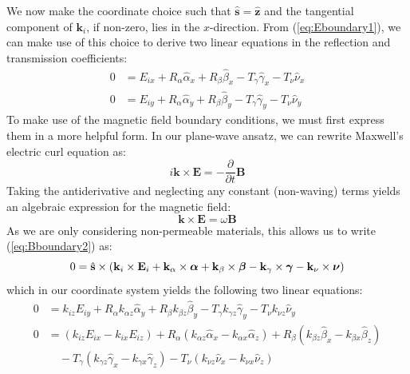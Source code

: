 \documentclass[11pt, reqno]{book}%
\newcounter{ct}
\newcommand{\es}{\begin{equation}}
\newcommand{\ef}{\end{equation} \vspace{0.05in}}
\newcommand{\mbf}{\mathbf}
\newcommand{\mbfg}[1]{\mbf{\mbox{\boldmath$#1$}}}
\newcommand{\mbfh}[1]{\hat{\mbf{#1}}}
\begin{document}
We now make the coordinate choice such that $\mbfh{s}=\mbfh{z}$ and the tangential component of $\mbf{k}_i$, if non-zero, lies in the $x$-direction. From (\ref{eq:Eboundary1}), we can make use of this choice to derive two linear equations in the reflection and transmission coefficients:
\begin{subequations}
\begin{align}
0 &= E_{ix}  +R_\alpha \hat{\alpha}_x +R_\beta \hat{\beta}_x - T_\gamma \hat{\gamma}_x -T_\nu \hat{\nu}_x \\
0 & = E_{iy}  +R_\alpha \hat{\alpha}_y +R_\beta \hat{\beta}_y - T_\gamma \hat{\gamma}_y -T_\nu \hat{\nu}_y
\end{align}
\label{eq:firssetboundaries}%
\end{subequations}
\noindent To make use of the magnetic field boundary conditions, we must first express them in a more helpful form. In our plane-wave ansatz, we can rewrite Maxwell's electric curl equation as: 
\es
i\mbf{k}\times\mbf{E} = -\frac{\partial}{\partial t}\mbf{B}
\ef
\noindent Taking the antiderivative and neglecting any constant (non-waving) terms yields an algebraic expression for the magnetic field:
\es
\mbf{k}\times\mbf{E} = \omega \mbf{B}
\label{eq:BfromE}
\ef
\noindent As we are only considering non-permeable materials, this allows us to write (\ref{eq:Bboundary2}) as:
\es
0 = \mbfh{s} \times \left( \mbf{k}_i \times \mbf{E}_i +\mbf{k}_\alpha \times \mbfg{\alpha} +\mbf{k}_\beta \times \mbfg{\beta} - \mbf{k}_\gamma \times \mbfg{\gamma} -\mbf{k}_\nu \times \mbfg{\nu} \right)
\label{eq:restatedmagbounds}
\ef 
\noindent which in our coordinate system yields the following two linear equations:
\begin{subequations}
\begin{align}
0 & = k_{iz} E_{iy} + R_\alpha k_{\alpha z} \hat{\alpha}_y + R_\beta k_{\beta z} \hat{\beta}_y  -T_\gamma k_{\gamma z} \hat{\gamma}_y - T_\nu k_{\nu z} \hat{\nu}_y \label{eq:magboundequation2} \\
0 & = \left(k_{iz}E_{ix}-k_{ix}E_{iz}  \right)+R_\alpha \left(k_{\alpha z} \hat{\alpha}_x - k_{\alpha x}\hat{\alpha}_z \right)+R_\beta (k_{\beta z} \hat{\beta}_x - k_{\beta x}\hat{\beta}_z )  \label{eq:magboundequation1} \\
& \quad-T_\gamma \left(k_{\gamma z} \hat{\gamma}_x - k_{\gamma x}\hat{\gamma}_z \right)-T_\nu \left(k_{\nu z} \hat{\nu}_x - k_{\nu x}\hat{\nu}_z \right) \nonumber 
\end{align}
\label{eq:secondhalfequationsRandT}%
\end{subequations}
\end{document}
